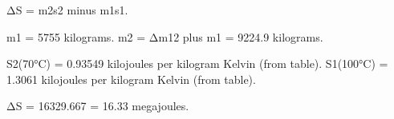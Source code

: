 ΔS = m2s2 minus m1s1.  

m1 = 5755 kilograms.  
m2 = Δm12 plus m1 = 9224.9 kilograms.  

S2(70°C) = 0.93549 kilojoules per kilogram Kelvin (from table).  
S1(100°C) = 1.3061 kilojoules per kilogram Kelvin (from table).  

ΔS = 16329.667 = 16.33 megajoules.